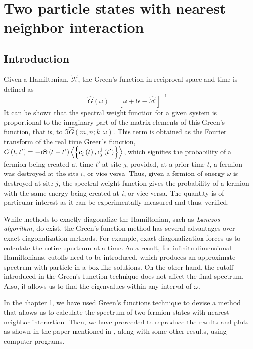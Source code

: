 \documentclass[a4paper, 11pt]{report}
\newcommand{\I}{\mathrm{i}}
\begin{document}
\newpage
\setcounter{page}{1}

\chapter{Two particle states with nearest neighbor interaction}\label{chap:NN}
\section{Introduction}\label{ssec:Introduction}
Given a Hamiltonian, $\hat{\mathcal{H}}$, the Green's function in reciprocal space and time is defined as
\begin{equation}
\hat{G}\left(\omega\right) = \left[ \omega + \I \epsilon - \hat{\mathcal{H}} \right]^{-1}
\end{equation}
It can be shown that the spectral weight function for a given system is proportional to the imaginary part of the matrix elements of this Green's function, that is, to $\Im{\hat{G}\left( m, n; k, \omega \right)}$. This term is obtained as the Fourier transform of the real time Green's function, $G \left(t, t'\right) = -\I \Theta \left(t - t'\right) \expval{\acomm{c^{}_{i}\left(t\right)}{c^{\dagger}_{j}\left(t'\right)}}$, which signifies the probability of a fermion being created at time $t'$ at site $j$, provided, at a prior time $t$, a fermion was destroyed at the site $i$, or vice versa. Thus, given a fermion of energy $\omega$ is destroyed at site $j$, the spectral weight function gives the probability of a fermion with the same energy being created at $i$, or vice versa. The quantity is of particular interest as it can be experimentally measured and thus, verified.

While methods to exactly diagonalize the Hamiltonian, such as \textit{Lanczos algorithm}, do exist, the Green's function method has several advantages over exact diagonalization methods. For example, exact diagonalization forces us to calculate the entire spectrum at a time. As a result, for infinite dimensional Hamiltonians, cutoffs need to be introduced, which produces an approximate spectrum with particle in a box like solutions. On the other hand, the cutoff introduced in the Green's function technique does not affect the final spectrum. Also, it allows us to find the eigenvalues within any interval of $\omega$.

In the chapter \ref{chap:NN}, we have used Green's functions technique to devise a method that allows us to calculate the spectrum of two-fermion states with nearest neighbor interaction. Then, we have proceeded to reproduce the results and plots as shown in the paper mentioned in \cite{bib:mb_paper}, along with some other results, using computer programs.
\end{document}

